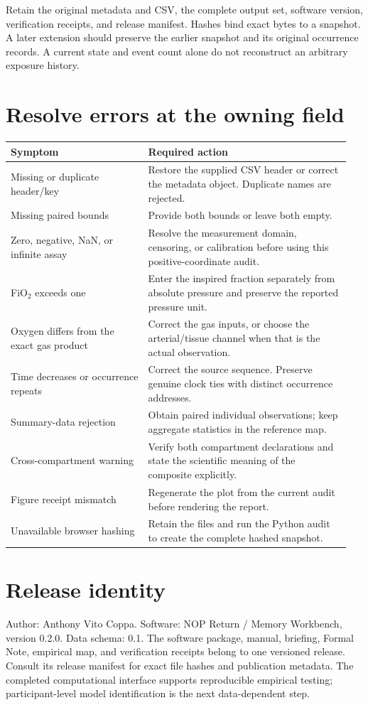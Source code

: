 \documentclass[11pt]{article}
\begin{document}
Retain the original metadata and CSV, the complete output set, software
version, verification receipts, and release manifest. Hashes bind exact
bytes to a snapshot. A later extension should preserve the earlier snapshot
and its original occurrence records. A current state and event count alone
do not reconstruct an arbitrary exposure history.

\section{Resolve errors at the owning field}

\begin{longtable}{@{}p{0.38\linewidth}p{0.57\linewidth}@{}}
\toprule Symptom & Required action \\ \midrule
Missing or duplicate header/key & Restore the supplied CSV header or correct
the metadata object. Duplicate names are rejected.\\
Missing paired bounds & Provide both bounds or leave both empty.\\
Zero, negative, NaN, or infinite assay & Resolve the measurement domain,
censoring, or calibration before using this positive-coordinate audit.\\
FiO\(_2\) exceeds one & Enter the inspired fraction separately from absolute
pressure and preserve the reported pressure unit.\\
Oxygen differs from the exact gas product & Correct the gas inputs, or choose
the arterial/tissue channel when that is the actual observation.\\
Time decreases or occurrence repeats & Correct the source sequence. Preserve
genuine clock ties with distinct occurrence addresses.\\
Summary-data rejection & Obtain paired individual observations; keep aggregate
statistics in the reference map.\\
Cross-compartment warning & Verify both compartment declarations and state
the scientific meaning of the composite explicitly.\\
Figure receipt mismatch & Regenerate the plot from the current audit before
rendering the report.\\
Unavailable browser hashing & Retain the files and run the Python audit to
create the complete hashed snapshot.\\
\bottomrule
\end{longtable}

\section*{Release identity}

Author: Anthony Vito Coppa. Software: NOP Return / Memory Workbench,
version 0.2.0. Data schema: 0.1. The software package, manual, briefing,
Formal Note, empirical map, and verification receipts belong to one
versioned release. Consult its release manifest for exact file hashes and
publication metadata. The completed computational interface supports
reproducible empirical testing; participant-level model identification is
the next data-dependent step.
\end{document}

